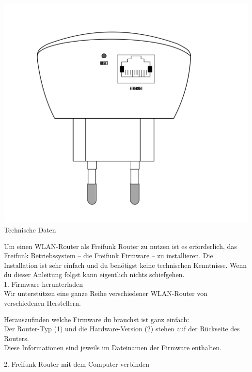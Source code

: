 \documentclass[11pt, a4paper,ngerman]{article}
\begin{document}
\begin{center}
\includegraphics[scale=0.30]{./back.pdf}\\
\Huge{Technische Daten}\\
\end{center}







Um einen WLAN-Router als Freifunk Router zu nutzen ist es erforderlich, das Freifunk Betriebssystem – die Freifunk Firmware – zu installieren. Die Installation ist sehr einfach und du benötigst keine technischen Kenntnisse. Wenn du dieser Anleitung folgst kann eigentlich nichts schiefgehen.\\

{\Large 1. Firmware herunterladen} \\

Wir unterstützen eine ganze Reihe verschiedener WLAN-Router von verschiedenen Herstellern. 

Herauszufinden welche Firmware du brauchst ist ganz einfach: \\
Der Router-Typ (1) und die Hardware-Version (2) stehen auf der Rückseite des Routers. \\
Diese Informationen sind jeweils im Dateinamen der Firmware enthalten.


{\Large 2. Freifunk-Router mit dem Computer verbinden} \\
\end{document}
